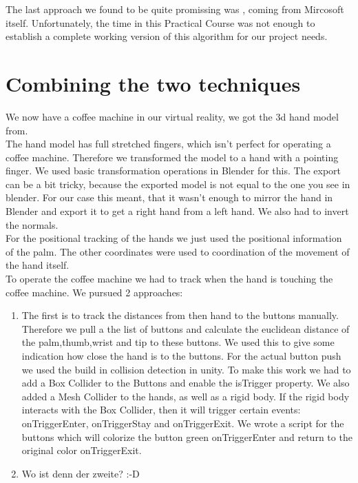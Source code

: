 \documentclass[11pt,a4paper,oldfontcommands, oneside]{memoir}
\begin{document}
%
%
%
The last approach we found to be quite promissing was \cite{joseph2016fits}, coming from Mircosoft itself. Unfortunately, the time in this Practical Course was not enough to establish a complete working version of this algorithm for our project needs. 

\section{Combining the two techniques}
We now have a coffee machine in our virtual reality, we got the 3d hand model from.\\
 The hand model has full stretched fingers, which isn't perfect for operating a coffee machine. Therefore we transformed the model to a hand with a pointing finger. We used basic transformation operations in Blender for this. The export can be a bit tricky, because the exported model is not equal to the one you see in blender. For our case this meant, that it wasn't enough to mirror the hand in Blender and export it to get a right hand from a left hand. We also had to invert the normals.\\
For the positional tracking of the hands we just used the positional information of the palm. The other coordinates were used to coordination of the movement of the hand itself.\\
To operate the coffee machine we had to track when the hand is touching the coffee machine. We pursued 2 approaches:
\begin{enumerate}
\item The first is to track the distances from then hand to the buttons manually. Therefore we pull a the list of buttons and calculate the euclidean distance of the palm,thumb,wrist and tip to these buttons. We used this to give some indication how close the hand is to the buttons. For the actual button push we used the build in collision detection in unity. To make this work we had to add a Box Collider to the Buttons and enable the isTrigger property. We also added a Mesh Collider to the hands, as well as a rigid body. If the rigid body interacts with the Box Collider, then it will trigger certain events: onTriggerEnter, onTriggerStay and onTriggerExit. We wrote a script for the buttons which will colorize the button green onTriggerEnter and return to the original color onTriggerExit. 
\item Wo ist denn der zweite? :-D
\end{enumerate} 
\end{document}
